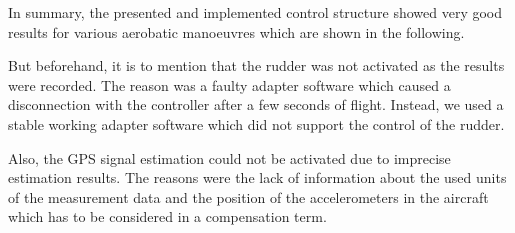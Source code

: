 \documentclass[11pt,a4paper]{scrartcl}		%
\begin{document}
In summary, the presented and implemented control structure showed very good results for various aerobatic manoeuvres which are shown in the following.

\medskip

But beforehand, it is to mention that the rudder was not activated as the results were recorded.
The reason was a faulty adapter software which caused a disconnection with the controller after a few seconds of flight. Instead, we used a stable working adapter software which did not support the control of the rudder.

Also, the GPS signal estimation could not be activated due to imprecise estimation results.
The reasons were the lack of information about the used units of the measurement data and the position of the accelerometers in the aircraft which has to be considered in a compensation term.

\bigskip







\newpage
\end{document}
